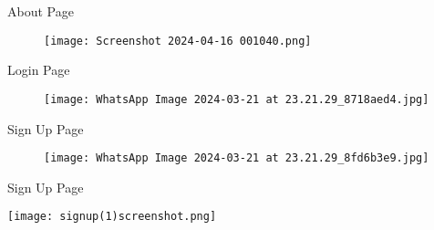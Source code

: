 \documentclass{beamer} %
\begin{document}
\begin{frame}{About Page}
    \vspace{5pt} %
    \begin{figure}
    
        \texttt{[image: Screenshot 2024-04-16 001040.png]}
    \end{figure}  
\end{frame}


\begin{frame}{Login Page}
    \vspace{5pt} %
    \begin{figure}
    
        \texttt{[image: WhatsApp Image 2024-03-21 at 23.21.29\_8718aed4.jpg]}
    \end{figure}
    
\end{frame}

\begin{frame}{Sign Up Page}
    \vspace{5pt} %
    \begin{figure}
        \texttt{[image: WhatsApp Image 2024-03-21 at 23.21.29\_8fd6b3e9.jpg]}
    \end{figure}
    
\end{frame}

\begin{frame}[c]{Sign Up Page}
	
\begin{usecase}
	\texttt{[image: signup(1)screenshot.png]}
\end{usecase}

\end{frame}	
\end{document}
